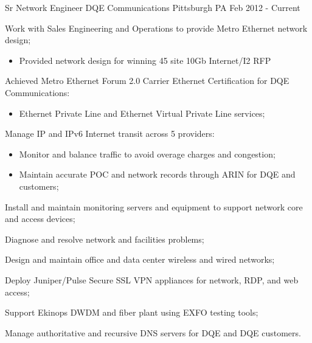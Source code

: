 


\begin{cventries}


\cventry
{Sr Network Engineer} %
{DQE Communications} %
{Pittsburgh PA} %
{Feb 2012 - Current} %
{ %
\begin{cvitems}
\item Work with Sales Engineering and Operations to provide Metro Ethernet network design;
  \begin{itemize}%
  \item Provided network design for winning 45 site 10Gb Internet/I2 RFP
  \end{itemize}
\item Achieved Metro Ethernet Forum 2.0 Carrier Ethernet Certification for DQE Communications:
  \begin{itemize}%
  \item Ethernet Private Line and Ethernet Virtual Private Line services;
  \end{itemize}
\item Manage IP and IPv6 Internet transit across 5 providers:
  \begin{itemize}%
  \item Monitor and balance traffic to avoid overage charges and congestion;
  \item Maintain accurate POC and network records through ARIN for DQE and customers;
  \end{itemize}
\item Install and maintain monitoring servers and equipment to support network core and access devices;
\item Diagnose and resolve network and facilities problems;
\item Design and maintain office and data center wireless and wired networks;
\item Deploy Juniper/Pulse Secure SSL VPN appliances for network, RDP, and web access;
\item Support Ekinops DWDM and fiber plant using EXFO testing tools;
\item Manage authoritative and recursive DNS servers for DQE and DQE customers.
\end{cvitems}
}


\end{cventries}
